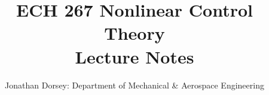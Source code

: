\documentclass[12px]{article}
\begin{document}
    \title{ECH 267 Nonlinear Control Theory \\ Lecture Notes }

    \author{Jonathan Dorsey: Department of Mechanical \& Aerospace Engineering}

    \maketitle


    
    
    
\end{document}
